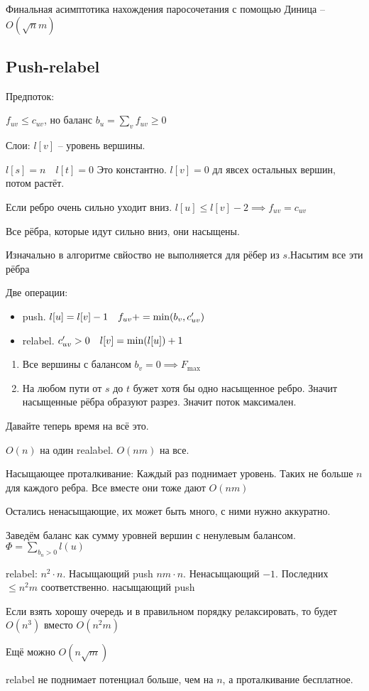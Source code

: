 Финальная асимптотика нахождения паросочетания с помощью Диница -- $O(\sqrt{n}m)$

\subsection{Push-relabel}

\begin{definition}
    Предпоток:

    $f_{uv} \leqslant c_{uv}$, но баланс $b_u = \sum_v f_{uv} \geqslant 0$

    Слои: $l[v] $ -- уровень вершины.

    $l[s] = n\quad l[t] = 0$ Это константно. $l[v] = 0$ дл явсех остальных вершин, потом растёт.
\end{definition}

\begin{property}
    Если ребро очень сильно уходит вниз. $l[u] \leqslant l[v] -2 \implies f_{uv} = c_{uv}$

    Все рёбра, которые идут сильно вниз, они насыщены.
\end{property}

Изначально в алгоритме свйоство не выполняется для рёбер из $s$.Насытим все эти рёбра

Две операции:
\begin{itemize}
    \item push. $l[u] = l[v] - 1\quad f_{uv} += \min(b_v, c^{\prime}_{uv})$
    \item relabel. $c^{\prime}_{uv} > 0\quad l[v] = \min(l[u]) + 1$
\end{itemize}

\begin{enumerate}
    \item Все вершины с балансом $b_v = 0 \implies F_{\max}$
    \item На любом пути от $s$ до $t$ бужет хотя бы одно насыщенное ребро. Значит насыщенные рёбра образуют разрез. Значит поток максимален.
\end{enumerate}

Давайте теперь время на всё это.

$O(n)$ на один realabel. $O(nm)$ на все.

Насыщающее проталкивание: Каждый раз поднимает уровень. Таких не больше $n$ для каждого ребра. Все вместе они тоже дают $O(nm)$

Остались ненасыщающие, их может быть много, с ними нужно аккуратно.

Заведём баланс как сумму уровней вершин с ненулевым балансом. $\Phi = \sum_{b_n >0} l(u)$

relabel: $n^2 \cdot n$. Насыщающий push $nm\cdot n$. Ненасыщающий $-1$. Последних $\leqslant n^2m$ соответственно.
насыщающий push

Если взять хорошу очередь и в правильном порядку релаксировать, то будет $O(n^3)$ вместо $O(n^2m)$

Ещё можно $O(n \sqrt{m} )$

relabel не поднимает потенциал больше, чем на $n$, а проталкивание бесплатное.
